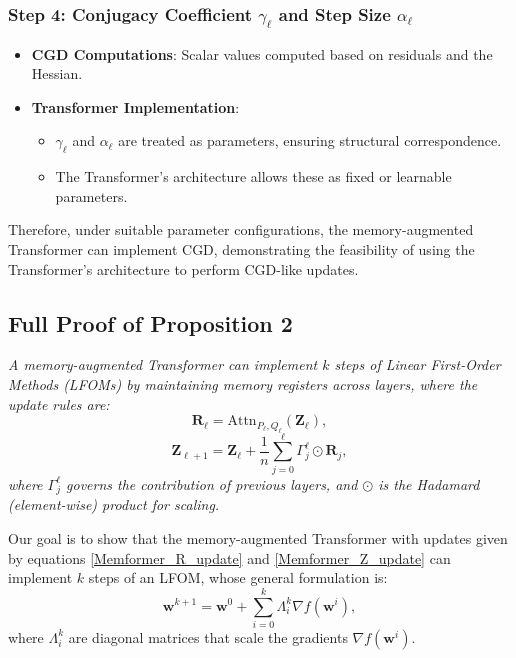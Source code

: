 \documentclass[11pt]{article}
\numberwithin{equation}{section}
\begin{document}
\subsubsection*{Step 4: Conjugacy Coefficient \(\gamma_\ell\) and Step Size \(\alpha_\ell\)}
\begin{itemize}
    \item \textbf{CGD Computations}: Scalar values computed based on residuals and the Hessian.
    \item \textbf{Transformer Implementation}: 
    \begin{itemize}
        \item \( \gamma_\ell \) and \( \alpha_\ell \) are treated as parameters, ensuring structural correspondence.
        \item The Transformer's architecture allows these as fixed or learnable parameters.
    \end{itemize}
\end{itemize}

Therefore, under suitable parameter configurations, the memory-augmented Transformer can implement CGD, demonstrating the feasibility of using the Transformer's architecture to perform CGD-like updates.

\subsection{Full Proof of Proposition 2}

\textit{A memory-augmented Transformer can implement \( k \) steps of Linear First-Order Methods (LFOMs) by maintaining memory registers across layers, where the update rules are:
    \begin{equation}
        \mathbf{R}_\ell = \mathrm{Attn}_{P_\ell, Q_\ell}(\mathbf{Z}_\ell), \label{Memformer_R_update}
    \end{equation}
    \begin{equation}
        \mathbf{Z}_{\ell+1} = \mathbf{Z}_\ell + \frac{1}{n} \sum_{j=0}^{\ell} \Gamma_j^\ell \odot \mathbf{R}_j, \label{Memformer_Z_update}
    \end{equation}
    where \( \Gamma_j^\ell \) governs the contribution of previous layers, and \( \odot \) is the Hadamard (element-wise) product for scaling.}

Our goal is to show that the memory-augmented Transformer with updates given by equations \eqref{Memformer_R_update} and \eqref{Memformer_Z_update} can implement \( k \) steps of an LFOM, whose general formulation is:
\[
    \mathbf{w}^{k+1} = \mathbf{w}^0 + \sum_{i=0}^k \Lambda_i^k \nabla f(\mathbf{w}^i), \label{eq:LFOM_update}
\]
where \(\Lambda_i^k\) are diagonal matrices that scale the gradients \(\nabla f(\mathbf{w}^i)\).
\end{document}
